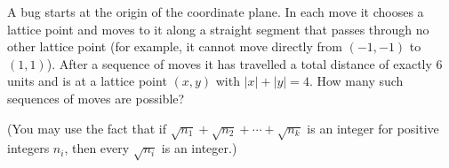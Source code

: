 A bug starts at the origin of the coordinate plane. In each move it chooses a lattice point and moves to it along a straight segment that passes through no other lattice point (for example, it cannot move directly from $(-1,-1)$ to $(1,1)$). After a sequence of moves it has travelled a total distance of exactly $6$ units and is at a lattice point $(x,y)$ with $|x|+|y|=4$. How many such sequences of moves are possible?

(You may use the fact that if $\sqrt{n_1}+\sqrt{n_2}+\cdots+\sqrt{n_k}$ is an integer for positive integers $n_i$, then every $\sqrt{n_i}$ is an integer.)
